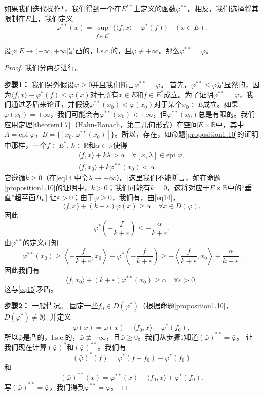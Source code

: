如果我们迭代操作$*$，我们得到一个在$E^{**}$上定义的函数$\varphi^{**}$。相反，我们选择将其限制在$E$上，我们定义
\[ \varphi^{**}(x) = \sup_{f \in E^*} \{\langle f, x \rangle - \varphi^*(f)\} \quad (x \in E). \]
\begin{theorem}\label{theorem1.11}
设$\varphi: E \to (-\infty, +\infty]$是凸的，l.s.c.的，且$\varphi \not\equiv +\infty$。那么$\varphi^{**}=\varphi$。
\end{theorem}
\begin{proof}
我们分两步进行。

\textbf{步骤1：} 我们另外假设$\varphi \geq 0$并且我们断言$\varphi^{**}=\varphi$。
首先，$\varphi^{**} \leq \varphi$是显然的，因为$\langle f, x \rangle - \varphi^*(f) \leq \varphi(x)$对于所有$x \in E$和$f \in E^*$成立。为了证明$\varphi^{**}=\varphi$，我们通过矛盾来论证，并假设$\varphi^{**}(x_0) < \varphi(x_0)$对于某个$x_0 \in E$成立。如果$\varphi(x_0)=+\infty$，我们可能会有$\varphi^{**}(x_0) < +\infty$，但$\varphi^{**}(x_0)$总是有限的。我们应用定理\ref{theorem1.7}（Hahn-Banach，第二几何形式）在空间$E \times \mathbb{R}$中，其中$A=\text{epi } \varphi$，$B=\{[x_0, \varphi^{**}(x_0)]\}$。所以，存在，如命题\ref{proposition1.10}的证明中那样，一个$f \in E^*$, $k \in \mathbb{R}$和$\alpha \in \mathbb{R}$使得
\begin{gather}
\langle f, x \rangle + k\lambda > \alpha \quad \forall [x, \lambda] \in \text{epi } \varphi, \label{eq14} \\
\langle f, x_0 \rangle + k\varphi^{**}(x_0) < \alpha. \label{eq15}
\end{gather}
它遵循$k \geq 0$（在\eqref{eq14}中令$\lambda \to +\infty$）。[这里我们不能断言，如在命题\ref{proposition1.10}的证明中，$k>0$；我们可能有$k=0$，这将对应于$E \times \mathbb{R}$中的“垂直”超平面$H$。]
让$\varepsilon > 0$；由于$\varphi \geq 0$，我们有，由\eqref{eq14}，
\[ \langle f, x \rangle + (k+\varepsilon)\varphi(x) \geq \alpha \quad \forall x \in D(\varphi). \]
因此
\[ \varphi^*\left(-\frac{f}{k+\varepsilon}\right) \leq -\frac{\alpha}{k+\varepsilon}. \]
由$\varphi^{**}$的定义可知
\[ \varphi^{**}(x_0) \geq \left\langle -\frac{f}{k+\varepsilon}, x_0 \right\rangle - \varphi^*\left(-\frac{f}{k+\varepsilon}\right) \geq -\left\langle \frac{f}{k+\varepsilon}, x_0 \right\rangle + \frac{\alpha}{k+\varepsilon}. \]
因此我们有
\[ \langle f, x_0 \rangle + (k+\varepsilon)\varphi^{**}(x_0) \geq \alpha \quad \forall \varepsilon > 0, \]
这与\eqref{eq15}矛盾。

\textbf{步骤2：} 一般情况。
固定一些$f_0 \in D(\varphi^*)$（根据命题\ref{proposition1.10}，$D(\varphi^*) \neq \emptyset$）并定义
\[ \bar{\varphi}(x) = \varphi(x) - \langle f_0, x \rangle + \varphi^*(f_0), \]
所以$\bar{\varphi}$是凸的，l.s.c.的，$\bar{\varphi} \not\equiv +\infty$，且$\bar{\varphi} \geq 0$。我们从步骤1知道$(\bar{\varphi})^{**} = \bar{\varphi}$。
让我们现在计算$(\bar{\varphi})^*$和$(\bar{\varphi})^{**}$。我们有
\[ (\bar{\varphi})^*(f) = \varphi^*(f+f_0) - \varphi^*(f_0) \]
和
\[ (\bar{\varphi})^{**}(x) = \varphi^{**}(x) - \langle f_0, x \rangle + \varphi^*(f_0). \]
写$(\bar{\varphi})^{**} = \bar{\varphi}$，我们得到$\varphi^{**} = \varphi$。
\end{proof}

